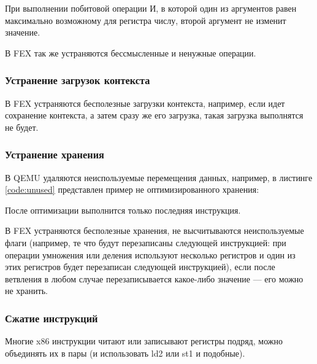 При выполнении побитовой операции И, в которой один из аргументов равен максимально возможному для регистра числу, второй аргумент не изменит значение.

В FEX так же устраняются бессмысленные и ненужные операции.

\subsubsection{Устранение загрузок контекста}

В FEX устраняются бесполезные загрузки контекста, например, если идет сохранение контекста, а затем сразу же его загрузка, такая загрузка выполнятся не будет. 

\subsubsection{Устранение хранения}

В QEMU удаляются неиспользуемые перемещения данных, например, в листинге \ref{code:unused} представлен пример не оптимизированного хранения:


После оптимизации выполнится только последняя инструкция.

В FEX устраняются бесполезные хранения, не высчитываются неиспользуемые флаги (например, те что будут перезаписаны следующей инструкцией: при операции умножения или деления используют несколько регистров и один из этих регистров будет перезаписан следующей инструкцией), если после ветвления в любом случае перезаписывается какое-либо значение --- его можно не хранить.

\subsubsection{Сжатие инструкций}

Многие x86 инструкции читают или записывают регистры подряд, можно объединять их в пары (и использовать ld2 или st1 и подобные).

